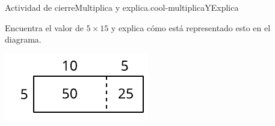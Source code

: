 \documentclass[14pt]{extarticle}
\begin{document}
\begin{project}{Actividad de cierre}{Multiplica y explica.}{cool-multiplicaYExplica}%
\begin{sidebyside}{2}{0}{0}{0}%
\begin{sbspanel}{0.6}%
Encuentra el valor de \(5\times 15\) y explica cómo está representado esto en el diagrama.%
\end{sbspanel}%
\begin{sbspanel}{0.4}%
\includegraphics[max width=\linewidth, center]{external/svg-source/tikz-file-147479-scale13.pdf}
\end{sbspanel}%
\end{sidebyside}%
\begin{image}{0}{1}{0}{}%

\end{image}
\end{project}
\end{document}
